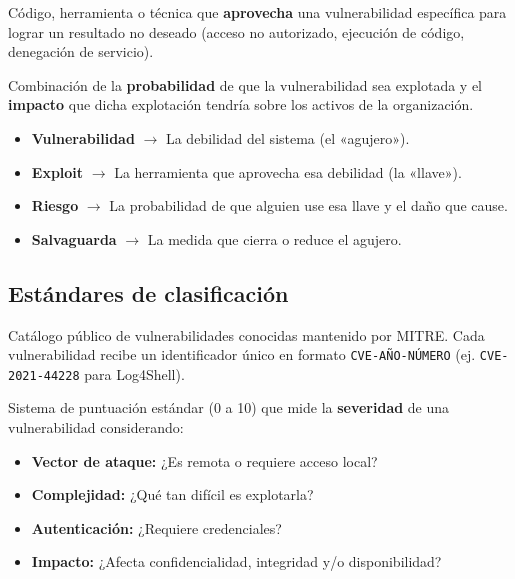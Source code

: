 \documentclass[11pt,a4paper]{article}
\begin{document}
\begin{definicion}[Exploit]
Código, herramienta o técnica que \textbf{aprovecha} una vulnerabilidad específica para lograr un resultado no deseado (acceso no autorizado, ejecución de código, denegación de servicio).
\end{definicion}

\begin{definicion}
Combinación de la \textbf{probabilidad} de que la vulnerabilidad sea explotada y el \textbf{impacto} que dicha explotación tendría sobre los activos de la organización.
\end{definicion}

\begin{clave}
\begin{itemize}[leftmargin=*]
  \item \textbf{Vulnerabilidad} $\rightarrow$ La debilidad del sistema (el «agujero»).
  \item \textbf{Exploit} $\rightarrow$ La herramienta que aprovecha esa debilidad (la «llave»).
  \item \textbf{Riesgo} $\rightarrow$ La probabilidad de que alguien use esa llave y el daño que cause.
  \item \textbf{Salvaguarda} $\rightarrow$ La medida que cierra o reduce el agujero.
\end{itemize}
\end{clave}

\subsection{Estándares de clasificación}

\begin{definicion}
Catálogo público de vulnerabilidades conocidas mantenido por MITRE. Cada vulnerabilidad recibe un identificador único en formato \texttt{CVE-AÑO-NÚMERO} (ej. \texttt{CVE-2021-44228} para Log4Shell).
\end{definicion}

\begin{definicion}
Sistema de puntuación estándar (0 a 10) que mide la \textbf{severidad} de una vulnerabilidad considerando:
\begin{itemize}[leftmargin=*]
  \item \textbf{Vector de ataque:} ¿Es remota o requiere acceso local?
  \item \textbf{Complejidad:} ¿Qué tan difícil es explotarla?
  \item \textbf{Autenticación:} ¿Requiere credenciales?
  \item \textbf{Impacto:} ¿Afecta confidencialidad, integridad y/o disponibilidad?
\end{itemize}
\end{definicion}
\end{document}
